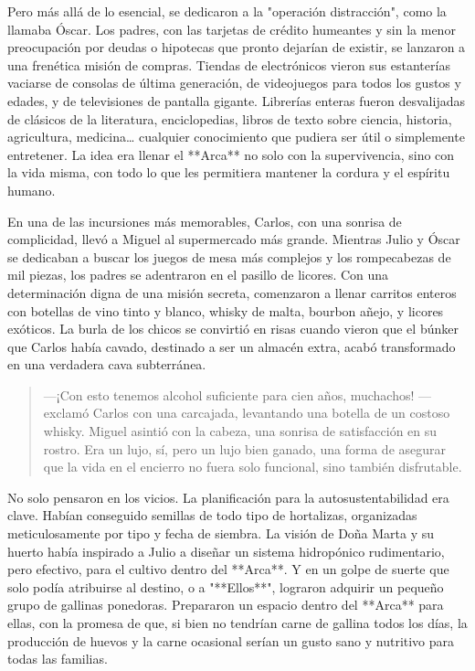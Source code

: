 \documentclass[a4paper,12pt]{book}
\begin{document}
Pero más allá de lo esencial, se dedicaron a la "operación distracción", como la llamaba Óscar. Los padres, con las tarjetas de crédito humeantes y sin la menor preocupación por deudas o hipotecas que pronto dejarían de existir, se lanzaron a una frenética misión de compras. Tiendas de electrónicos vieron sus estanterías vaciarse de consolas de última generación, de videojuegos para todos los gustos y edades, y de televisiones de pantalla gigante. Librerías enteras fueron desvalijadas de clásicos de la literatura, enciclopedias, libros de texto sobre ciencia, historia, agricultura, medicina… cualquier conocimiento que pudiera ser útil o simplemente entretener. La idea era llenar el **Arca** no solo con la supervivencia, sino con la vida misma, con todo lo que les permitiera mantener la cordura y el espíritu humano.

En una de las incursiones más memorables, Carlos, con una sonrisa de complicidad, llevó a Miguel al supermercado más grande. Mientras Julio y Óscar se dedicaban a buscar los juegos de mesa más complejos y los rompecabezas de mil piezas, los padres se adentraron en el pasillo de licores. Con una determinación digna de una misión secreta, comenzaron a llenar carritos enteros con botellas de vino tinto y blanco, whisky de malta, bourbon añejo, y licores exóticos. La burla de los chicos se convirtió en risas cuando vieron que el búnker que Carlos había cavado, destinado a ser un almacén extra, acabó transformado en una verdadera cava subterránea.

\begin{quote}
    —¡Con esto tenemos alcohol suficiente para cien años, muchachos! —exclamó Carlos con una carcajada, levantando una botella de un costoso whisky. Miguel asintió con la cabeza, una sonrisa de satisfacción en su rostro. Era un lujo, sí, pero un lujo bien ganado, una forma de asegurar que la vida en el encierro no fuera solo funcional, sino también disfrutable.
\end{quote}

No solo pensaron en los vicios. La planificación para la autosustentabilidad era clave. Habían conseguido semillas de todo tipo de hortalizas, organizadas meticulosamente por tipo y fecha de siembra. La visión de Doña Marta y su huerto había inspirado a Julio a diseñar un sistema hidropónico rudimentario, pero efectivo, para el cultivo dentro del **Arca**. Y en un golpe de suerte que solo podía atribuirse al destino, o a "**Ellos**", lograron adquirir un pequeño grupo de gallinas ponedoras. Prepararon un espacio dentro del **Arca** para ellas, con la promesa de que, si bien no tendrían carne de gallina todos los días, la producción de huevos y la carne ocasional serían un gusto sano y nutritivo para todas las familias.
\end{document}
